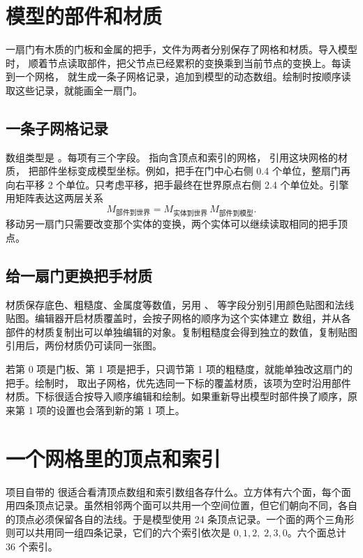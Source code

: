 \clearpage
\section{模型的部件和材质}
一扇门有木质的门板和金属的把手，文件为两者分别保存了网格和材质。导入模型时， 顺着节点读取部件，把父节点已经累积的变换乘到当前节点的变换上。每读到一个网格， 就生成一条子网格记录，追加到模型的动态数组。绘制时按顺序读取这些记录，就能画全一扇门。

\subsection{一条子网格记录}
数组类型是 。每项有三个字段。 指向含顶点和索引的网格， 引用这块网格的材质， 把部件坐标变成模型坐标。例如，把手在门中心右侧 0.4 个单位，整扇门再向右平移 2 个单位。只考虑平移，把手最终在世界原点右侧 2.4 个单位处。引擎用矩阵表达这两层关系
\[
 M_{\text{部件到世界}} =
 M_{\text{实体到世界}}\, M_{\text{部件到模型}} .
\]
移动另一扇门只需要改变那个实体的变换，两个实体可以继续读取相同的把手顶点。

\subsection{给一扇门更换把手材质}
材质保存底色、粗糙度、金属度等数值，另用 、 等字段分别引用颜色贴图和法线贴图。编辑器开启材质覆盖时，会按子网格的顺序为这个实体建立  数组，并从各部件的材质复制出可以单独编辑的对象。复制粗糙度会得到独立的数值，复制贴图引用后，两份材质仍可读同一张图。

若第 0 项是门板、第 1 项是把手，只调节第 1 项的粗糙度，就能单独改这扇门的把手。绘制时， 取出子网格，优先选同一下标的覆盖材质，该项为空时沿用部件材质。下标很适合按导入顺序编辑和绘制。如果重新导出模型时部件换了顺序，原来第 1 项的设置也会落到新的第 1 项上。


\clearpage
\section{一个网格里的顶点和索引}
项目自带的  很适合看清顶点数组和索引数组各存什么。立方体有六个面，每个面用四条顶点记录。虽然相邻两个面可以共用一个空间位置，但它们朝向不同，各自的顶点必须保留各自的法线。于是模型使用 24 条顶点记录。一个面的两个三角形则可以共用同一组四条记录，它们的六个索引依次是 \(0,1,2,\;2,3,0\)。六个面总计 36 个索引。

